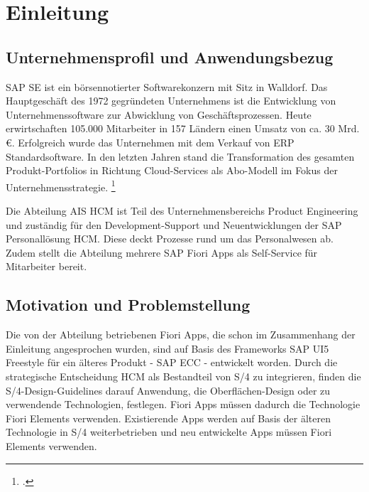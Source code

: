 \chapter{Einleitung}

\section{Unternehmensprofil und Anwendungsbezug}

SAP SE ist ein börsennotierter Softwarekonzern mit Sitz in Walldorf. Das Hauptgeschäft des 1972 gegründeten Unternehmens ist die Entwicklung von Unternehmenssoftware zur Abwicklung von Geschäftsprozessen. Heute erwirtschaften 105.000 Mitarbeiter in 157 Ländern einen Umsatz von ca. 30 Mrd. \euro{}. Erfolgreich wurde das Unternehmen mit dem Verkauf von ERP Standardsoftware. In den letzten Jahren stand die Transformation des gesamten Produkt-Portfolios in Richtung Cloud-Services als Abo-Modell im Fokus der Unternehmensstrategie. \footcite[Vgl.][]{sap_geschichte_2023}

Die Abteilung AIS HCM ist Teil des Unternehmensbereichs Product Engineering und zuständig für den Development-Support und Neuentwicklungen der SAP Personallösung HCM. Diese deckt Prozesse rund um das Personalwesen ab. Zudem stellt die Abteilung mehrere SAP Fiori Apps als Self-Service für Mitarbeiter bereit. 


\section{Motivation und Problemstellung}

Die von der Abteilung betriebenen Fiori Apps, die schon im Zusammenhang der Einleitung angesprochen wurden, sind auf Basis des Frameworks SAP UI5 Freestyle für ein älteres Produkt - SAP ECC - entwickelt worden. Durch die strategische Entscheidung HCM als Bestandteil von S/4 zu integrieren, finden die S/4-Design-Guidelines darauf Anwendung, die \zB Oberflächen-Design oder zu verwendende Technologien, festlegen. Fiori Apps müssen dadurch die Technologie Fiori Elements verwenden. Existierende Apps werden auf Basis der älteren Technologie in S/4 weiterbetrieben und neu entwickelte Apps müssen Fiori Elements verwenden.

